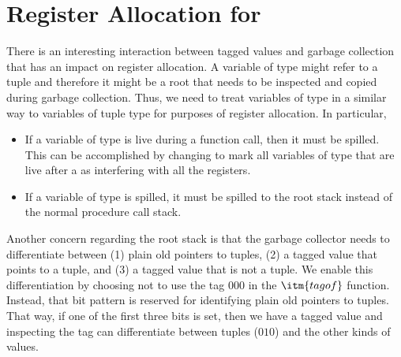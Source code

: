 \documentclass[7x10]{TimesAPriori_MIT}%
\def\racketEd{0}
\def\pythonEd{1}
\def\edition{0}
\newcommand{\racket}[1]{{\if\edition\racketEd{#1}\fi}}
\newcommand{\python}[1]{{\if\edition\pythonEd #1\fi}}
\newtheorem{exercise}[theorem]{Exercise}
\numberwithin{theorem}{chapter}
\numberwithin{definition}{chapter}
\numberwithin{equation}{chapter}
\begin{document}



\section{Register Allocation for \LangAny{}}
\label{sec:register-allocation-Lany}

There is an interesting interaction between tagged values and garbage
collection that has an impact on register allocation.  A variable of
type \ANYTY{} might refer to a tuple and therefore it might be a root
that needs to be inspected and copied during garbage collection. Thus,
we need to treat variables of type \ANYTY{} in a similar way to
variables of tuple type for purposes of register allocation.  In
particular,
\begin{itemize}
\item If a variable of type \ANYTY{} is live during a function call,
  then it must be spilled. This can be accomplished by changing
   to mark all variables of type \ANYTY{}
  that are live after a  as interfering with all the
  registers.

\item If a variable of type \ANYTY{} is spilled, it must be spilled to
  the root stack instead of the normal procedure call stack.
\end{itemize}

Another concern regarding the root stack is that the garbage collector
needs to differentiate between (1) plain old pointers to tuples, (2) a
tagged value that points to a tuple, and (3) a tagged value that is
not a tuple. We enable this differentiation by choosing not to use the
tag $000$ in the $\itm{tagof}$ function. Instead, that bit pattern is
reserved for identifying plain old pointers to tuples. That way, if
one of the first three bits is set, then we have a tagged value and
inspecting the tag can differentiate between tuples ($010$) and the
other kinds of values.

\end{document}
